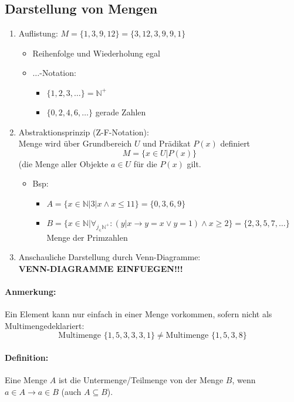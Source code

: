 \documentclass[10pt,a4paper]{article}
\begin{document}
\subsection{Darstellung von Mengen}
\begin{enumerate}
\item Auflistung: $M=\{1,3,9,12\}=\{3,12,3,9,9,1\}$
\begin{itemize}
\item Reihenfolge und Wiederholung egal
\item \glq $\ldots$\grq -Notation:
\begin{itemize}
\item $\{1,2,3,\ldots\}=\mathbb{N}^+$
\item $\{0,2,4,6,\ldots\}$ gerade Zahlen
\end{itemize}
\end{itemize}
\item Abstraktionsprinzip (Z-F-Notation):\\
Menge wird über Grundbereich $U$ und Prädikat $P(x)$ definiert
\[
M=\{x\in U | P(x)\}
\]
(die Menge aller Objekte $a\in U$ für die $P(x)$ gilt.
\begin{itemize}
\item Bsp:
\begin{itemize}
\item $A=\{x\in\mathbb{N}|3|x \land x\leq 11\} = \{0,3,6,9\}$
\item $B=\{x\in\mathbb{N}|\forall_{j_\in\mathbb{N}^+}:(y|x\rightarrow y=x \lor y=1)\land x\geq 2\}=\{2,3,5,7,\ldots \}$ Menge der Primzahlen
\end{itemize}
\end{itemize}
\item Anschauliche Darstellung durch Venn-Diagramme:\\
\textbf{VENN-DIAGRAMME EINFUEGEN!!!}
\end{enumerate}

\paragraph{Anmerkung:} Ein Element kann nur einfach in einer Menge vorkommen, sofern nicht als \glqq Multimenge\grqq deklariert:
\[
\text{Multimenge }\{1,5,3,3,3,1\} \neq \text{Multimenge }\{1,5,3,8\}
\]
\paragraph{Definition:}Eine Menge $A$ ist die Untermenge/Teilmenge von der Menge $B$, wenn $a\in A\rightarrow a\in B$ (auch $A\subseteq B$).\\
\end{document}
